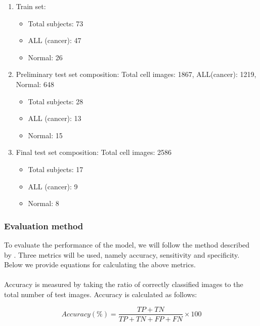 \documentclass[a4paper,11pt]{article}
\begin{document}
\begin{enumerate}
\item Train set:

\begin{itemize}
\item Total subjects: 73
\item ALL (cancer): 47
\item Normal: 26
\end{itemize}


\item Preliminary test set composition: Total cell images: 1867, ALL(cancer): 1219, Normal: 648
\begin{itemize}

\item Total subjects: 28
\item ALL (cancer): 13
\item Normal: 15
\end{itemize}

\item Final test set composition: Total cell images: 2586
\begin{itemize}

\item Total subjects: 17
\item ALL (cancer): 9
\item Normal: 8
\end{itemize}
\end{enumerate}

\subsubsection{Evaluation method}
To evaluate the performance of the model, we will follow the method described by \citep{Sara}. Three metrics will be used, namely accuracy, sensitivity and specificity. Below we provide equations for calculating the above metrics.

\paragraph{}
 Accuracy is measured by taking the ratio of correctly classified images to the total number of test images. Accuracy is calculated as follows:
 
 

\begin{equation}
Accuracy (\%) = \frac{TP+TN}{TP+TN+FP+FN} \times 100
\end{equation}
\end{document}
